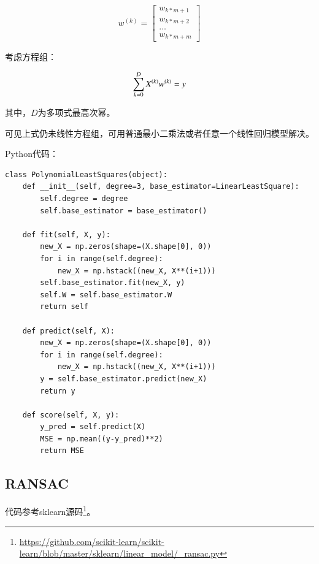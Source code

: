 \documentclass{article}
\begin{document}
\begin{equation}
	w^{(k)}=\begin{bmatrix}
	w_{k*m+1}\\ 
	w_{k*m+2}\\ 
	\ldots\\ 
	w_{k*m+m}
	\end{bmatrix}
\end{equation}

考虑方程组：

\begin{equation}
	\sum_{k=0}^{D}\limits X^{(k)} w^{(k)}=y
\end{equation}

其中，$D$为多项式最高次幂。

可见上式仍未线性方程组，可用普通最小二乘法或者任意一个线性回归模型解决。

Python代码：

\begin{lstlisting}[title={多项式最小二乘法代码}]
class PolynomialLeastSquares(object):
    def __init__(self, degree=3, base_estimator=LinearLeastSquare):
        self.degree = degree
        self.base_estimator = base_estimator()

    def fit(self, X, y):
        new_X = np.zeros(shape=(X.shape[0], 0))
        for i in range(self.degree):
            new_X = np.hstack((new_X, X**(i+1)))
        self.base_estimator.fit(new_X, y)
        self.W = self.base_estimator.W
        return self

    def predict(self, X):
        new_X = np.zeros(shape=(X.shape[0], 0))
        for i in range(self.degree):
            new_X = np.hstack((new_X, X**(i+1)))
        y = self.base_estimator.predict(new_X)
        return y

    def score(self, X, y):
        y_pred = self.predict(X)
        MSE = np.mean((y-y_pred)**2)
        return MSE
\end{lstlisting}

\subsection{RANSAC}

代码参考sklearn源码\footnote{\url{https://github.com/scikit-learn/scikit-learn/blob/master/sklearn/linear\_model/\_ransac.py}}。
\end{document}
